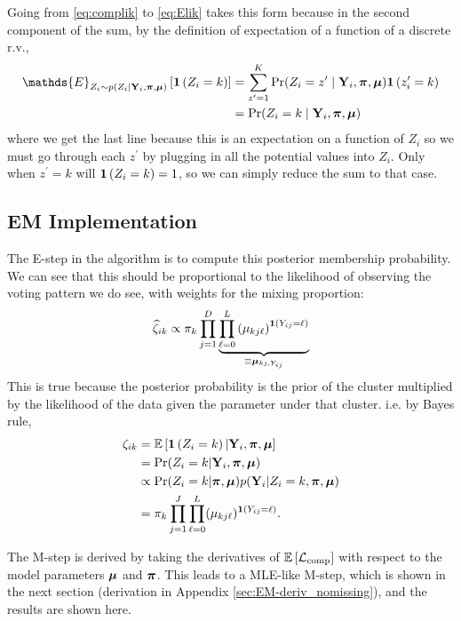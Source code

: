 \documentclass[11pt]{article}
\begin{document}
Going from \ref{eq:complik} to \ref{eq:Elik} takes this form because in the second component of the sum, by the definition of expectation of a function of a discrete r.v.,
\begin{align*}
\mathds{E}_{Z_i \sim p(Z_i | \bY_i, \bpi, \bmu)}\left[\ind{Z_i = k}\right] &=  \sum^K_{z^\prime=1}\Pr(Z_i = z^\prime \mid \bY_i, \bpi, \bmu) \ind{z_i^\prime = k}\\
&= \Pr(Z_i = k \mid \bY_i, \bpi, \bmu)
\end{align*}
\noindent where we get the last line because this is an expectation on a function of \(Z_i\) so we must go through each \(z^\prime\) by plugging in all the potential values into \(Z_i\). Only when \(z^\prime = k\) will \(\bm{1}\left(Z_i = k\right) = 1\), so we can simply reduce the sum to that case.

\subsection{EM Implementation} 


The E-step in the algorithm is to compute this posterior membership probability. We can see that this should be proportional to the likelihood of observing the voting pattern we do see, with weights for the mixing proportion:
\begin{align}
\widehat{\zeta}_{ik} \propto \pi_k\prod^D_{j = 1}\underbrace{\prod^{L}_{\ell = 0}\left(\mu_{kj\ell}\right)^{\bm{1}\left(Y_{ij} = \ell\right)}}_{\equiv \bm{\mu}_{kj, Y_{ij}}}
\end{align}
This is true because the posterior probability is the prior of the cluster multiplied by the likelihood of the data given the parameter under that cluster. i.e. by Bayes rule,
\begin{align*}
\zeta_{ik} &= \mathbb{E}\left[\bm{1}\left(Z_i = k\right) | \mathbf{Y}_i, \bm{\pi}, \bm{\mu}\right]\\
&= \Pr(Z_i = k | \mathbf{Y}_i, \bm{\pi}, \bm{\mu})\\
&\propto \Pr(Z_i = k | \bm{\pi}, \bm{\mu})p(\mathbf{Y}_i | Z_i = k, \bm{\pi}, \bm{\mu})\\
&= \pi_k \prod^J_{j =1}\prod^{L}_{\ell = 0}(\mu_{kj\ell})^{\bm{1}\left(Y_{ij} = \ell\right)}.
\end{align*}

The M-step is derived by taking the derivatives of \(\mathbb{E}\left[\mathcal{L}_{\text{comp}}\right]\) with respect to the model parameters \(\bm{\mu}\) and \(\bm{\pi}\). This leads to a MLE-like M-step, which is shown in the next section (derivation in Appendix \ref{sec:EM-deriv_nomissing}), and the results are shown here.
\end{document}
